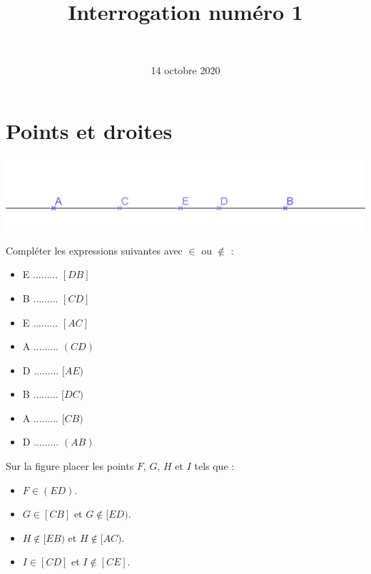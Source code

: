 \documentclass[a4paper,12pt]{exam}
\author{\ }
\date{14 octobre 2020}
\title{Interrogation numéro 1}
\begin{document}
%	

\maketitle
\section{Points et droites}

\begin{center}
	\includegraphics[scale=0.2]{img/droite}	
\end{center}

\begin{questions}
	\question Compléter les expressions suivantes avec $\in$ ou $\notin$ :
	
	\begin{multicols}{4}
		\begin{itemize}
			
			\item E ......... $[DB]$
			\item B ......... $[CD]$
			\item E ......... $[AC]$			
			\item A ......... $(CD)$
			\item D ......... $[AE)$
			\item B ......... $[DC)$
			\item A ......... $[CB)$
			\item D ......... $(AB)$
		\end{itemize}
	\end{multicols}

	\question Sur la figure placer les points $F$, $G$, $H$ et $I$ tels que :
	
	\begin{itemize}
		\item $F \in (ED)$.
		\item $G \in [CB] $ et $G \notin [ED)$.		
		\item $H \notin [EB) $ et $H \notin [AC)$.
		\item $I \in [CD] $ et $I \notin [CE]$.
		
	\end{itemize}
\end{questions}
\end{document}
